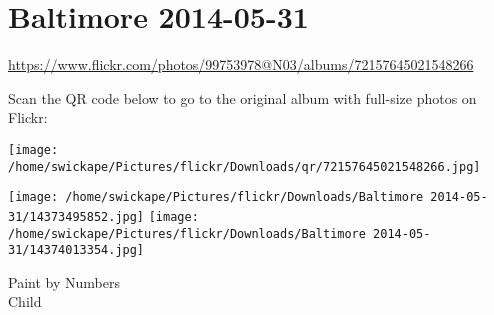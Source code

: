 \documentclass[10pt,letterpaper]{article}
\title{}
\author{}
\date{}
\begin{document}
\section*{Baltimore 2014-05-31}

\url{https://www.flickr.com/photos/99753978@N03/albums/72157645021548266}

Scan the QR code below to go to the original album with full-size photos on Flickr:

\texttt{[image: /home/swickape/Pictures/flickr/Downloads/qr/72157645021548266.jpg]}
\pagebreak

\texttt{[image: /home/swickape/Pictures/flickr/Downloads/Baltimore 2014-05-31/14373495852.jpg]}
\texttt{[image: /home/swickape/Pictures/flickr/Downloads/Baltimore 2014-05-31/14374013354.jpg]}

Paint by Numbers\\
Child
\pagebreak
\end{document}
